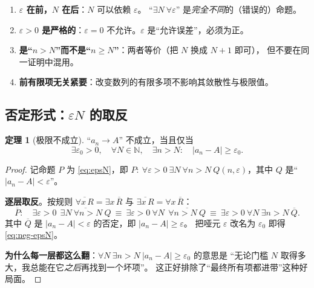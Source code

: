 \documentclass[11pt,a4paper]{ctexart}
\theoremstyle{definition}
\newtheorem{theorem}{定理}[section]
\theoremstyle{remark}
\newcommand{\N}{\mathbb{N}}
\newcommand{\eps}{\varepsilon}
\newcommand{\abs}[1]{\left\lvert #1 \right\rvert}
\begin{document}
\begin{warnbox}[读定义的四个要点]
\begin{enumerate}[label=\arabic*.]
  \item \textbf{$\eps$ 在前，$N$ 在后}：$N$ 可以依赖 $\eps$。
        “$\exists N\ \forall\eps$” 是\emph{完全不同}的（错误的）命题。
  \item \textbf{$\eps>0$ 是严格的}：$\eps=0$ 不允许。$\eps$ 是“允许误差”，必须为正。
  \item \textbf{是“$n>N$”而不是“$n\ge N$”}：两者等价（把 $N$ 换成 $N+1$ 即可），
        但不要在同一证明中混用。
  \item \textbf{前有限项无关紧要}：改变数列的有限多项不影响其敛散性与极限值。
\end{enumerate}
\end{warnbox}

\subsection{否定形式：$\varepsilon$\text{-}$N$ 的取反}

\begin{theorem}[极限不成立]\label{thm:neg-seq}
“$a_n\to A$” 不成立，当且仅当
\begin{equation}\label{eq:neg-epsN}
  \exists\eps_0>0,\quad \forall N\in\N,\quad \exists n>N:\quad \abs{a_n-A}\ge\eps_0 .
\end{equation}
\end{theorem}

\begin{proof}
记命题 $P$ 为 \eqref{eq:epsN}，即
$P:\ \forall\eps>0\ \exists N\ \forall n>N\ Q(n,\eps)$，其中 $Q$ 是“$\abs{a_n-A}<\eps$”。

\textbf{逐层取反}。按规则 $\overline{\forall x\,R}=\exists x\,\overline{R}$ 与
$\overline{\exists x\,R}=\forall x\,\overline{R}$：
\[
  \overline{P}:\quad
  \exists\eps>0\ \ \overline{\exists N\ \forall n>N\ Q}
  \ \equiv\
  \exists\eps>0\ \forall N\ \ \overline{\forall n>N\ Q}
  \ \equiv\
  \exists\eps>0\ \forall N\ \exists n>N\ \overline{Q}.
\]
其中 $\overline{Q}$ 是 $\abs{a_n-A}<\eps$ 的否定，即 $\abs{a_n-A}\ge\eps$。
把哑元 $\eps$ 改名为 $\eps_0$ 即得 \eqref{eq:neg-epsN}。

\textbf{为什么每一层都这么翻}：$\forall N\ \exists n>N\ \abs{a_n-A}\ge\eps_0$ 的意思是
“无论门槛 $N$ 取得多大，我总能在它\emph{之后}再找到一个坏项”。
这正好排除了“最终所有项都进带”这种好局面。

\end{proof}
\end{document}
